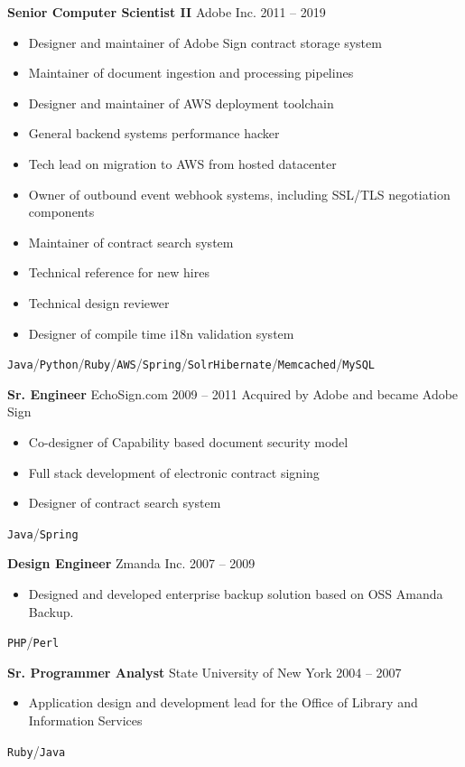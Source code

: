 \documentclass{res}
\begin{document}
        {\bf Senior Computer Scientist II} \hfill Adobe Inc. \hfill 2011 -- 2019
        \begin{itemize}
        \item Designer and maintainer of Adobe Sign contract storage system
        \item Maintainer of document ingestion and processing pipelines
        \item Designer and maintainer of AWS deployment toolchain
        \item General backend systems performance hacker
        \item Tech lead on migration to AWS from hosted datacenter
        \item Owner of outbound event webhook systems, including SSL/TLS negotiation components
        \item Maintainer of contract search system
        \item Technical reference for new hires
        \item Technical design reviewer
        \item Designer of compile time i18n validation system
        \end{itemize}
	\texttt{Java}\slash\texttt{Python}\slash\texttt{Ruby}\slash\texttt{AWS}\slash\texttt{Spring}\slash\texttt{Solr}\texttt{Hibernate}\slash\texttt{Memcached}\slash\texttt{MySQL}
        

        {\bf Sr. Engineer} \hfill EchoSign.com 2009 -- 2011
        Acquired by Adobe and became Adobe Sign
        \begin{itemize}
        \item Co-designer of Capability based document security model
        \item Full stack development of electronic contract signing
        \item Designer of contract search system
        \end{itemize}
	\texttt{Java}\slash\texttt{Spring}
        
        {\bf Design Engineer} \hfill Zmanda Inc. \hfill 2007 -- 2009
        \begin{itemize}
        \item Designed and developed enterprise backup solution based on OSS Amanda Backup.
        \end{itemize}
        \texttt{PHP}\slash\texttt{Perl}
        
        {\bf Sr. Programmer Analyst} \hfill State University of New York \hfill 2004 -- 2007
        \begin{itemize}
        \item Application design and development lead for the Office of Library and Information Services
        \end{itemize}
        \texttt{Ruby}\slash\texttt{Java}
          
\end{document}

